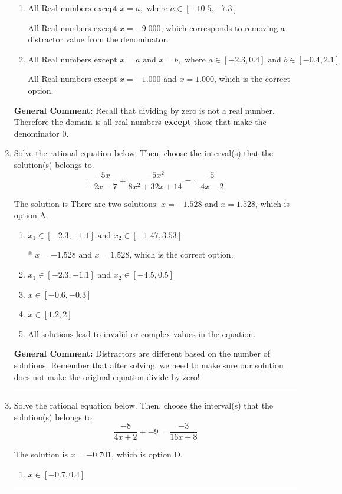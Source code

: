 \documentclass{extbook}[14pt]
\newcommand{\litem}[1]{\item #1

\rule{\textwidth}{0.4pt}}
\begin{document}
\begin{enumerate}
{\begin{enumerate}[label=\Alph*.]
All Real numbers except $x = -1.000$, which corresponds to removing only 1 value from the denominator.
\item \( \text{All Real numbers except } x = a, \text{ where } a \in [-10.5, -7.3] \)

All Real numbers except $x = -9.000$, which corresponds to removing a distractor value from the denominator.
\item \( \text{All Real numbers except } x = a \text{ and } x = b, \text{ where } a \in [-2.3, 0.4] \text{ and } b \in [-0.4, 2.1] \)

All Real numbers except $x = -1.000$ and $x = 1.000$, which is the correct option.
\end{enumerate}

\textbf{General Comment:} Recall that dividing by zero is not a real number. Therefore the domain is all real numbers \textbf{except} those that make the denominator 0.
}
\litem{
Solve the rational equation below. Then, choose the interval(s) that the solution(s) belongs to.
\[ \frac{-5x}{-2x -7} + \frac{-5x^{2}}{8x^{2} +32 x + 14} = \frac{-5}{-4x -2} \]

The solution is \( \text{There are two solutions: } x = -1.528 \text{ and } x = 1.528 \), which is option A.\begin{enumerate}[label=\Alph*.]
\item \( x_1 \in [-2.3, -1.1] \text{ and } x_2 \in [-1.47,3.53] \)

* $x = -1.528 \text{ and } x = 1.528$, which is the correct option.
\item \( x_1 \in [-2.3, -1.1] \text{ and } x_2 \in [-4.5,0.5] \)


\item \( x \in [-0.6,-0.3] \)


\item \( x \in [1.2,2] \)


\item \( \text{All solutions lead to invalid or complex values in the equation.} \)


\end{enumerate}

\textbf{General Comment:} Distractors are different based on the number of solutions. Remember that after solving, we need to make sure our solution does not make the original equation divide by zero!
}
\litem{
Solve the rational equation below. Then, choose the interval(s) that the solution(s) belongs to.
\[ \frac{-8}{4x + 2} + -9 = \frac{-3}{16x + 8} \]

The solution is \( x = -0.701 \), which is option D.\begin{enumerate}[label=\Alph*.]
\item \( x \in [-0.7,0.4] \)


\end{enumerate}}
\end{enumerate}
\end{document}
